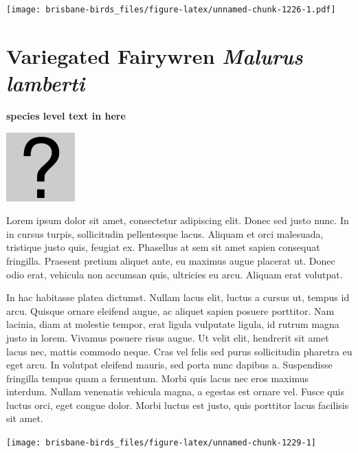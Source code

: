 \documentclass[]{book}
\let\origfigure\figure
\let\endorigfigure\endfigure
\renewenvironment{figure}[1][2] {
  \expandafter\origfigure\expandafter[H]
} {
  \endorigfigure
}
\begin{document}
\begin{figure}
\centering
\texttt{[image: brisbane-birds\_files/figure-latex/unnamed-chunk-1226-1.pdf]}
\caption{\label{fig:unnamed-chunk-1226}insert figure caption}
\end{figure}

\section{\texorpdfstring{Variegated Fairywren \emph{Malurus
lamberti}}{Variegated Fairywren Malurus lamberti}}\label{variegated-fairywren-malurus-lamberti}

\textbf{species level text in here}

\begin{figure}
\centering
\includegraphics{assets/missing.png}
\caption{No image for species}
\end{figure}

Lorem ipsum dolor sit amet, consectetur adipiscing elit. Donec sed justo
nunc. In in cursus turpis, sollicitudin pellentesque lacus. Aliquam et
orci malesuada, tristique justo quis, feugiat ex. Phasellus at sem sit
amet sapien consequat fringilla. Praesent pretium aliquet ante, eu
maximus augue placerat ut. Donec odio erat, vehicula non accumsan quis,
ultricies eu arcu. Aliquam erat volutpat.

In hac habitasse platea dictumst. Nullam lacus elit, luctus a cursus ut,
tempus id arcu. Quisque ornare eleifend augue, ac aliquet sapien posuere
porttitor. Nam lacinia, diam at molestie tempor, erat ligula vulputate
ligula, id rutrum magna justo in lorem. Vivamus posuere risus augue. Ut
velit elit, hendrerit sit amet lacus nec, mattis commodo neque. Cras vel
felis sed purus sollicitudin pharetra eu eget arcu. In volutpat eleifend
mauris, sed porta nunc dapibus a. Suspendisse fringilla tempus quam a
fermentum. Morbi quis lacus nec eros maximus interdum. Nullam venenatis
vehicula magna, a egestas est ornare vel. Fusce quis luctus orci, eget
congue dolor. Morbi luctus est justo, quis porttitor lacus facilisis sit
amet.

\begin{figure}
\texttt{[image: brisbane-birds\_files/figure-latex/unnamed-chunk-1229-1]} \caption{insert figure caption}\label{fig:unnamed-chunk-1229}
\end{figure}
\end{document}
